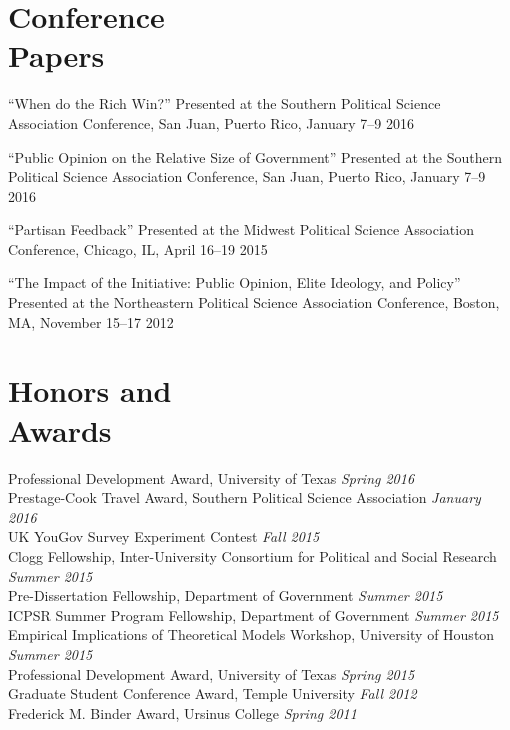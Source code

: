 \documentclass[margin,line]{res}
\newenvironment{list2}{
    \begin{list}{--}{%
        \setlength{\itemsep}{0in}
        \setlength{\parsep}{0in} \setlength{\parskip}{0in}
        \setlength{\topsep}{0in} \setlength{\partopsep}{0in}
        \setlength{\leftmargin}{0.2in}}}{\end{list}}
\begin{document}
\begin{resume}
\section{\sc Conference\\Papers}
\begin{list2}
\item ``When do the Rich Win?'' Presented at the Southern Political
  Science Association Conference, San Juan, Puerto Rico, January 7--9 2016
\item ``Public Opinion on the Relative Size of Government'' Presented
  at the Southern Political Science Association Conference, San Juan,
  Puerto Rico, January 7--9 2016
\item ``Partisan Feedback'' Presented at the Midwest Political Science
  Association Conference, Chicago, IL, April 16--19 2015
\item ``The Impact of the Initiative: Public Opinion, Elite Ideology,
  and Policy'' Presented at the Northeastern Political Science
  Association Conference, Boston, MA, November 15--17 2012
\end{list2}

\section{\sc Honors and \\Awards}
Professional Development Award, University of Texas \hfill
\emph{Spring 2016} \\
Prestage-Cook Travel Award, Southern Political Science Association
\hfill \emph{January 2016} \\
UK YouGov Survey Experiment Contest \hfill \emph{Fall 2015} \\
Clogg Fellowship, Inter-University Consortium for Political and Social
Research \hfill \emph{Summer 2015} \\
Pre-Dissertation Fellowship, Department of Government \hfill
\emph{Summer 2015} \\
ICPSR Summer Program Fellowship, Department of Government \hfill
\emph{Summer 2015} \\
Empirical Implications of Theoretical Models Workshop, University of
Houston  \hfill \emph{Summer 2015} \\
Professional Development Award, University of Texas \hfill
\emph{Spring 2015} \\
Graduate Student Conference Award, Temple University \hfill \emph{Fall
  2012} \\
Frederick M. Binder Award, Ursinus College \hfill \emph{Spring 2011} %


\end{resume}
\end{document}
